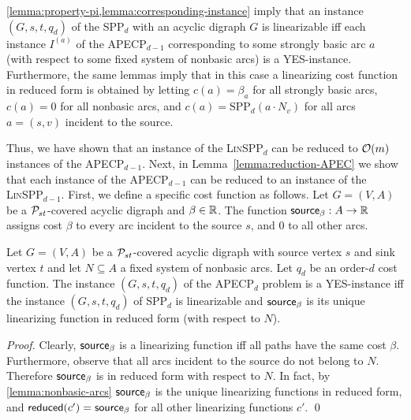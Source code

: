 \cref{lemma:property-pi,lemma:corresponding-instance} imply that an instance $(G,s,t,q_d)$ of the SPP$_d$ with an acyclic digraph $G$ is linearizable  iff each  instance $I^{(a)}$ of the APECP$_{d-1}$ corresponding to some strongly basic arc $a$   (with respect to some fixed system of nonbasic arcs)  is a YES-instance. Furthermore, the same lemmas imply that in this case a linearizing cost function in reduced form is obtained by letting $c(a) = \beta_a$ for all strongly basic arcs, $c(a) = 0$ for all nonbasic arcs, and $c(a) = \text{SPP}_d(a \cdot N_v)$ for all arcs $a = (s,v)$ incident to the source.


Thus, we have shown that an instance of the  \textsc{Lin}SPP$_d$ can be reduced to $\mathcal{O}(m)$ instances  of the APECP$_{d-1}$.  
Next, in Lemma~\ref{lemma:reduction-APEC} we show that each instance of the APECP$_{d-1}$  can  be reduced to an instance of  the \textsc{Lin}SPP$_{d-1}$.
%
First, we define a specific cost function as follows. 
Let $G = (V, A)$ be a $\mathcal{P}_{st}$-covered acyclic digraph and $\beta \in \mathbb{R}$. The function $\textsf{source}_\beta : A \rightarrow \mathbb{R}$  assigns cost $\beta$ to every arc incident to the source $s$, and $0$ to all other arcs.

\begin{lemma}
\label{lemma:reduction-APEC}
    Let $G = (V, A)$ be a $\mathcal{P}_{st}$-covered acyclic digraph with source vertex $s$ and sink vertex $t$ and let  $N \subseteq A$ a fixed system of nonbasic arcs. Let $q_d$ be an order-$d$  cost function. The instance $(G,s,t,q_d)$ of the APECP$_d$ problem is a YES-instance iff the instance $(G,s,t, q_d)$ of SPP$_d$ is linearizable and $\textsf{source}_\beta$ is its unique linearizing function in reduced form (with respect to $N$).
\end{lemma}
\begin{proof}
    Clearly,  $\textsf{source}_\beta$ is a linearizing function iff   all paths have the same cost $\beta$. %
    Furthermore, observe that all  arcs incident to the source do not belong to $N$. Therefore $\textsf{source}_\beta$ is in reduced form with respect to $N$. In fact, by \cref{lemma:nonbasic-arcs}  $\textsf{source}_\beta$ is the unique linearizing  functions in reduced form, and $\operatorname{\textsf{reduced}}(c') = \textsf{source}_\beta$ for all other linearizing functions $c'$.
\qed
\end{proof}


